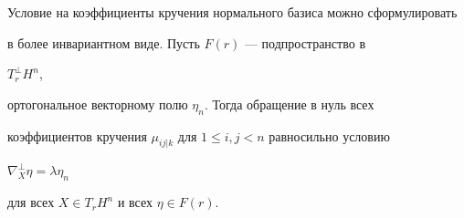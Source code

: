 \begin{note}


Условие на коэффициенты кручения нормального базиса можно сформулировать


в более инвариантном виде. Пусть $F(r)$ --- подпространство в


$T_r^{ \perp }H^n$, 


ортогональное векторному полю $\eta_n$. Тогда обращение в нуль всех 


коэффициентов кручения $\mu_{ij|k}$ для $1 \leq i,j <n$ равносильно условию 


$\nabla_X^{\perp} \eta = \lambda \eta_n$


для всех $X \in T_rH^n$ и всех $\eta \in F(r)$.


\end{note}





